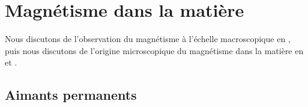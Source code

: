 \documentclass[12pt,fancy]{cours}
\begin{document}

\section{Magnétisme dans la matière}
Nous discutons de l'observation du magnétisme à l'échelle macroscopique en , puis nous discutons de l'origine microscopique du magnétisme dans la matière en  et .


\subsection{Aimants permanents}
\label{sec:aimants_permanents}
\end{document}

